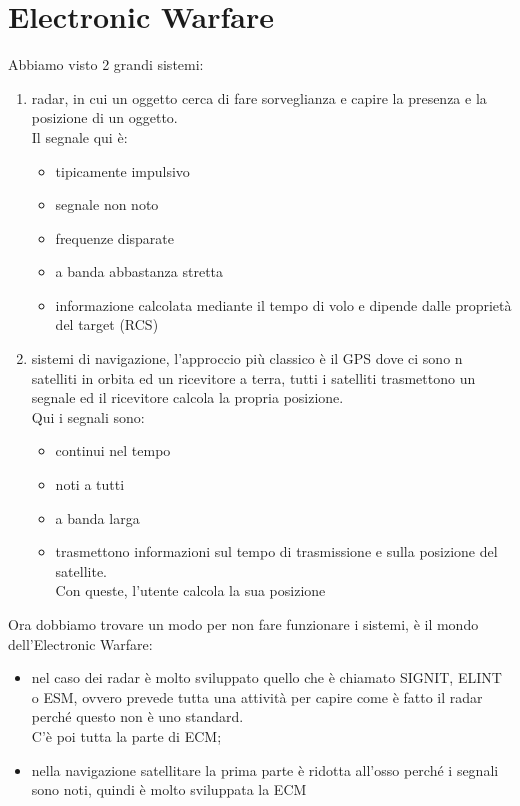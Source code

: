 \documentclass[oneside, 12pt]{extbook}
\begin{document}
\section{Electronic Warfare}
Abbiamo visto 2 grandi sistemi:
\begin{enumerate}
	\item radar, in cui un oggetto cerca di fare sorveglianza e capire la presenza e la posizione di un oggetto.\\
	Il segnale qui è:
	\begin{itemize}
		\item tipicamente impulsivo
		\item segnale non noto
		\item frequenze disparate
		\item a banda abbastanza stretta
		\item informazione calcolata mediante il tempo di volo e dipende dalle proprietà del target (RCS)
	\end{itemize}
	\item sistemi di navigazione, l'approccio più classico è il GPS dove ci sono n satelliti in orbita ed un ricevitore a terra, tutti i satelliti trasmettono un segnale ed il ricevitore calcola la propria posizione.\\
	Qui i segnali sono:
	\begin{itemize}
		\item continui nel tempo
		\item noti a tutti
		\item a banda larga
		\item trasmettono informazioni sul tempo di trasmissione e sulla posizione del satellite.\\
		Con queste, l'utente calcola la sua posizione
	\end{itemize}
\end{enumerate}
Ora dobbiamo trovare un modo per non fare funzionare i sistemi, è il mondo dell'Electronic Warfare:
\begin{itemize}
	\item nel caso dei radar è molto sviluppato quello che è chiamato SIGNIT, ELINT o ESM, ovvero prevede tutta una attività per capire come è fatto il radar perché questo non è uno standard.\\
	C'è  poi tutta la parte di ECM;
	\item nella navigazione satellitare la prima parte è ridotta all'osso perché i segnali sono noti, quindi è molto sviluppata la ECM
\end{itemize}
\end{document}
